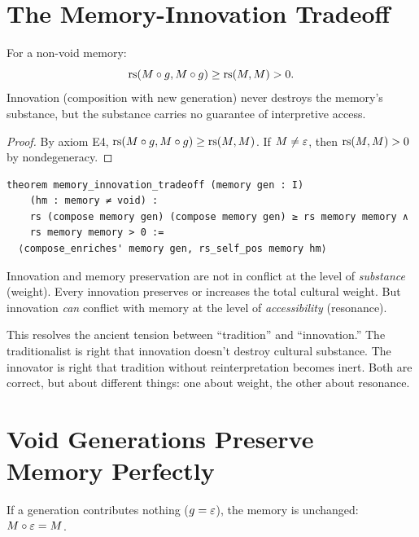 \section{The Memory-Innovation Tradeoff}

\begin{theorem}
\label{thm:memory-innovation}
For a non-void memory:
\[
  \mathrm{rs}(M \circ g, M \circ g) \geq \mathrm{rs}(M, M) > 0.
\]
Innovation (composition with new generation) never destroys the memory's
substance, but the substance carries no guarantee of interpretive access.
\end{theorem}

\begin{proof}
By axiom E4, $\mathrm{rs}(M \circ g, M \circ g) \geq \mathrm{rs}(M, M)$.
If $M \neq \varepsilon$, then $\mathrm{rs}(M, M) > 0$ by nondegeneracy.
\end{proof}

\begin{lstlisting}
theorem memory_innovation_tradeoff (memory gen : I)
    (hm : memory ≠ void) :
    rs (compose memory gen) (compose memory gen) ≥ rs memory memory ∧
    rs memory memory > 0 :=
  ⟨compose_enriches' memory gen, rs_self_pos memory hm⟩
\end{lstlisting}

\begin{remark}
Innovation and memory preservation are not in conflict at the level
of \emph{substance} (weight).  Every innovation preserves or increases
the total cultural weight.  But innovation \emph{can} conflict with
memory at the level of \emph{accessibility} (resonance).

This resolves the ancient tension between ``tradition'' and
``innovation.''  The traditionalist is right that innovation doesn't
destroy cultural substance.  The innovator is right that tradition
without reinterpretation becomes inert.  Both are correct, but about
different things: one about weight, the other about resonance.
\end{remark}

\section{Void Generations Preserve Memory Perfectly}

\begin{theorem}
\label{thm:void-gen}
If a generation contributes nothing ($g = \varepsilon$), the memory is
unchanged:
$M \circ \varepsilon = M$.
\end{theorem}

